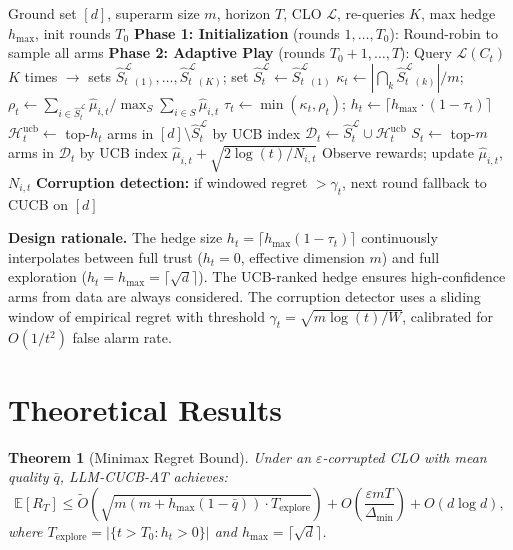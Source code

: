 \documentclass{article}
\newtheorem{theorem}{Theorem}
\newcommand{\E}{\mathbb{E}}
\newcommand{\Lset}{\mathcal{L}}
\newcommand{\Dt}{\mathcal{D}_t}
\newcommand{\Hucb}{\mathcal{H}^{\mathrm{ucb}}_t}
\newcommand{\SL}{\hat{S}^{\Lset}_t}
\begin{document}
\begin{algorithm}[t]
\caption{LLM-CUCB-AT: Combinatorial UCB with Adaptive LLM Trust}
\label{alg:llm_cucb_at}
\begin{algorithmic}[1]
\REQUIRE Ground set $[d]$, superarm size $m$, horizon $T$, CLO $\Lset$, re-queries $K$, max hedge $h_{\max}$, init rounds $T_0$
\STATE \textbf{Phase 1: Initialization} (rounds $1, \ldots, T_0$): Round-robin to sample all arms
\STATE \textbf{Phase 2: Adaptive Play} (rounds $T_0+1, \ldots, T$):
    \STATE Query $\Lset(C_t)$ $K$ times $\to$ sets $\SL_{(1)}, \ldots, \SL_{(K)}$; set $\SL \gets \SL_{(1)}$
    \STATE $\kappa_t \gets |\bigcap_{k} \SL_{(k)}| / m$; \quad $\rho_t \gets \sum_{i \in \SL} \hat{\mu}_{i,t} \big/ \max_{S} \sum_{i \in S} \hat{\mu}_{i,t}$
    \STATE $\tau_t \gets \min(\kappa_t, \rho_t)$; \quad $h_t \gets \lceil h_{\max} \cdot (1 - \tau_t) \rceil$
    \STATE $\Hucb \gets$ top-$h_t$ arms in $[d] \setminus \SL$ by UCB index
    \STATE $\Dt \gets \SL \cup \Hucb$
    \STATE $S_t \gets$ top-$m$ arms in $\Dt$ by UCB index $\hat{\mu}_{i,t} + \sqrt{2\log(t) / N_{i,t}}$
    \STATE Observe rewards; update $\hat{\mu}_{i,t}$, $N_{i,t}$
    \STATE \textbf{Corruption detection:} if windowed regret $> \gamma_t$, next round fallback to CUCB on $[d]$
\ENDFOR
\end{algorithmic}
\end{algorithm}

\textbf{Design rationale.}
The hedge size $h_t = \lceil h_{\max}(1 - \tau_t) \rceil$ continuously interpolates between full trust ($h_t = 0$, effective dimension $m$) and full exploration ($h_t = h_{\max} = \lceil\sqrt{d}\rceil$).
The UCB-ranked hedge ensures high-confidence arms from data are always considered.
The corruption detector uses a sliding window of empirical regret with threshold $\gamma_t = \sqrt{m\log(t)/W}$, calibrated for $O(1/t^2)$ false alarm rate.

\section{Theoretical Results}
\label{sec:theory}

\begin{theorem}[Minimax Regret Bound]
\label{thm:main}
Under an $\varepsilon$-corrupted CLO with mean quality $\bar{q}$, LLM-CUCB-AT achieves:
\[
\E[R_T] \leq \tilde{O}\!\left(\sqrt{m(m + h_{\max}(1-\bar{q})) \cdot T_{\mathrm{explore}}}\right) + O\!\left(\frac{\varepsilon m T}{\Delta_{\min}}\right) + O(d \log d),
\]
where $T_{\mathrm{explore}} = |\{t > T_0 : h_t > 0\}|$ and $h_{\max} = \lceil\sqrt{d}\rceil$.
\end{theorem}
\end{document}
